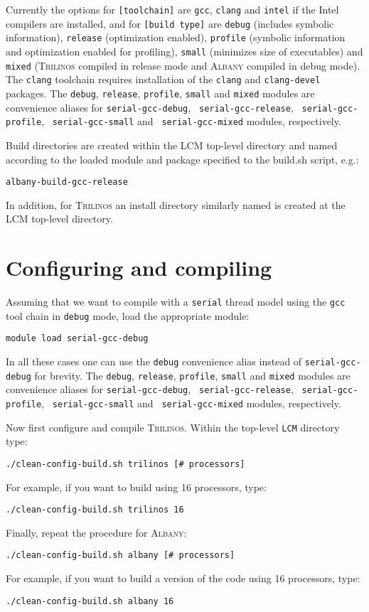 \documentclass{article}
\newcommand{\trilinos}{\textsc{Trilinos}}
\newcommand{\albany}{\textsc{Albany}}
\newcommand{\lcm}{\textsc{LCM}}
\begin{document}
Currently the options for \verb+[toolchain]+ are \verb+gcc+,
\verb+clang+ and \verb+intel+ if the Intel compilers are installed,
and for \verb+[build type]+ are \verb+debug+ (includes symbolic
information), \verb+release+ (optimization enabled), \verb+profile+
(symbolic information and optimization enabled for profiling),
\verb+small+ (minimizes size of executables) and \verb+mixed+
(\trilinos{} compiled in release mode and \albany{} compiled in debug
mode). The \verb+clang+ toolchain requires installation of the
\verb+clang+ and \verb+clang-devel+ packages. The \verb+debug+,
\verb+release+, \verb+profile+, \verb+small+ and \verb+mixed+ modules
are convenience aliases for \verb+serial-gcc-debug+,
\verb+ serial-gcc-release+, \verb+ serial-gcc-profile+,
\verb+ serial-gcc-small+ and \verb+ serial-gcc-mixed+ modules,
respectively.

Build directories are created within the \lcm{} top-level directory
and named according to the loaded module and package specified to the
build.sh script, e.g.:
\begin{verbatim}
albany-build-gcc-release
\end{verbatim}
In addition, for \trilinos{} an install directory similarly named is
created at the \lcm{} top-level directory.

\section{Configuring and compiling}
\label{sec:config-build}

Assuming that we want to compile with a \verb+serial+ thread model
using the \verb+gcc+ tool chain in \verb+debug+ mode, load the
appropriate module:
\begin{verbatim}
module load serial-gcc-debug
\end{verbatim}

In all these cases one can use the \verb+debug+ convenience alias instead of
\verb+serial-gcc-debug+ for brevity. The \verb+debug+, \verb+release+,
\verb+profile+, \verb+small+ and \verb+mixed+ modules are convenience aliases
for \verb+serial-gcc-debug+, \verb+ serial-gcc-release+,
\verb+ serial-gcc-profile+, \verb+ serial-gcc-small+ and
\verb+ serial-gcc-mixed+ modules, respectively.

Now first configure and compile \trilinos{}. Within the top-level
\verb+LCM+ directory type:
\begin{verbatim}
./clean-config-build.sh trilinos [# processors]
\end{verbatim}
For example, if you want to build using 16 processors, type:
\begin{verbatim}
./clean-config-build.sh trilinos 16
\end{verbatim}
Finally, repeat the procedure for \albany{}:
\begin{verbatim}
./clean-config-build.sh albany [# processors]
\end{verbatim}
For example, if you want to build a version of the code using 16
processors, type:
\begin{verbatim}
./clean-config-build.sh albany 16
\end{verbatim}
\end{document}
